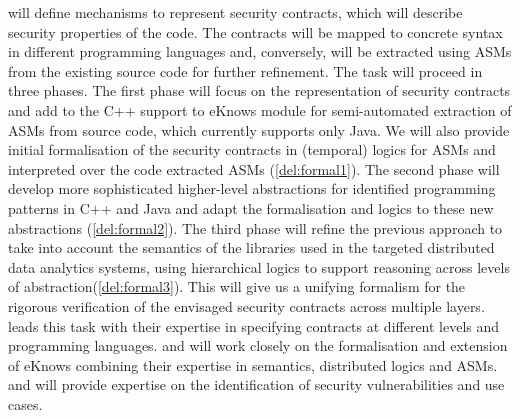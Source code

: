 \begin{Workpackage}{\thewpno}
\begin{Task}
\theTask{} will define mechanisms to represent security contracts, which will describe security properties of the code. The contracts will be mapped to concrete syntax in different
programming languages and, conversely, will be extracted using ASMs from the existing source code for further refinement. The task will proceed in three phases.
The first phase will focus on the representation of security contracts and add to the C++ support to \textsf{eKnows} module for semi-automated extraction of ASMs from source code, which currently supports only Java. We will also provide initial formalisation of the security contracts in (temporal) logics for ASMs and interpreted over the code extracted ASMs (\ref{del:formal1}). The second phase will develop more sophisticated higher-level abstractions for identified programming patterns in C++ and Java and adapt the formalisation and logics to these new abstractions (\ref{del:formal2}). The third phase will refine the previous approach to take into account the semantics of the libraries used in the targeted distributed data analytics systems, using hierarchical logics to support reasoning across levels of abstraction(\ref{del:formal3}). This will give us a unifying formalism for the rigorous verification of the envisaged security contracts across multiple layers.
\UCM leads this task with their expertise in specifying contracts at different levels and programming languages. \SA and \SCCHshort will work closely on the formalisation and extension of \textsf{eKnows} combining their expertise in semantics, distributed logics and ASMs. \IBMshort and \SOPRAshort will provide expertise on the identification of security vulnerabilities and use cases.
\end{Task}

\begin{Task}
\TaskResults{%
\ref{del:formal1},
\ref{del:formal2},
\ref{del:formal3}
}
\TaskHeader{}


\end{Task}
\end{Workpackage}
